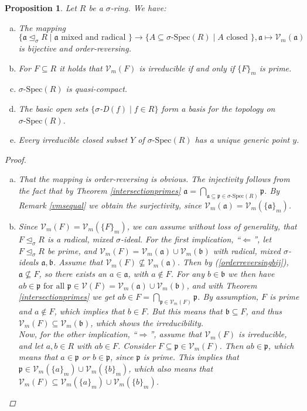 \documentclass{article}
\def\Vm{\mathcal{V}_m}
\def\V{\mathcal{V}}
\def\a{\mathfrak{a}}
\def\b{\mathfrak{b}}
\def\p{\mathfrak{p}}
\def\s{\sigma}
\def\si{\unlhd_{\sigma}}
\def\sSpec{\sigma\text{-Spec}}
\def\fa{\text{ for all }}
\newenvironment{bew}{\begin{proof}[Proof]}{\end{proof}}
\theoremstyle{plain}
\newtheorem{prop}[Satz]{Proposition}
\theoremstyle{definition}
\begin{document}
\begin{prop}
Let $R$ be a $\s$-ring. We have:
\begin{enumerate}[(a)]
\item \label{vmbijection} The mapping 
$$\{ \a \si R \mid \a\text{ mixed and radical }\} \rightarrow \{ A \subseteq \sSpec(R) \mid A \text{ closed }\}, \a \mapsto \Vm(\a)$$
 is bijective and order-reversing.
\item \label{irred=prime} For $F \subseteq R$ it holds that $\Vm(F)$ is irreducible if and only if $\{F\}_m$ is prime.
\item $\sSpec(R)$ is quasi-compact.
\item The basic open sets $\{ \s$-D$(f) \mid f \in R \}$ form a basis for the topology on $\sSpec(R)$.
\item Every irreducible closed subset $Y$ of $\sSpec(R)$ has a unique generic point $y$.
\end{enumerate}
\begin{bew}
\begin{enumerate}[(a)]
\item \label{orderreversingbij} That the mapping is order-reversing is obvious. The injectivity follows from the fact that by Theorem \ref{intersectionprimes} $\a = \bigcap_{\a \subseteq \p \in \sSpec(R)} \p$. By Remark \ref{vmsequal} we obtain the surjectivity,
 since $\Vm(\a) = \Vm(\{\a\}_m)$.
\item Since $\Vm(F) = \Vm(\{F\}_m)$, we can assume without loss of generality, that $F \si R$ is a radical, mixed $\s$-ideal.
For the first implication, ``$\Leftarrow$'', let $F \si R$ be prime, and $\Vm(F) = \Vm(\a) \cup \Vm(\b)$ with radical, mixed $\s$-ideals $\a, \b$. Assume that $\Vm(F) \not\subseteq \Vm(\a)$. Then by (\ref{orderreversingbij}), $\a \not \subseteq F$, so there exists an $a \in \a$, with $a \notin F$.
For any $b \in \b$ we then have $ab \in \p \fa \p \in \V(F) = \Vm(\a) \cup \Vm(\b)$, and with Theorem \ref{intersectionprimes} we get $ab \in F = \bigcap_{\p \in \Vm(F)}\p$. By assumption, $F$ is prime and $a \notin F$, which implies
 that  $b \in F$. But this means that $\b \subseteq F$, and thus $\Vm(F) \subseteq \Vm(\b)$, which shows the irreducibility. \\
\indent Now, for the other implication, ``$\Rightarrow$'', assume that $\Vm(F)$ is irreducible, and let $a,b \in R$ with $ab \in F$. Consider $F \subseteq \p \in \Vm(F)$. Then $ab \in \p$, 
which means that $a \in \p$ or $b \in \p$, since $\p$ is prime. This implies that $\p \in \Vm(\{a\}_m) \cup \Vm(\{b\}_m)$, which also means that $\Vm(F) \subseteq \Vm(\{a\}_{m}) \cup \Vm(\{b\}_{m})$.

\end{enumerate}
\end{bew}
\end{prop}
\end{document}
